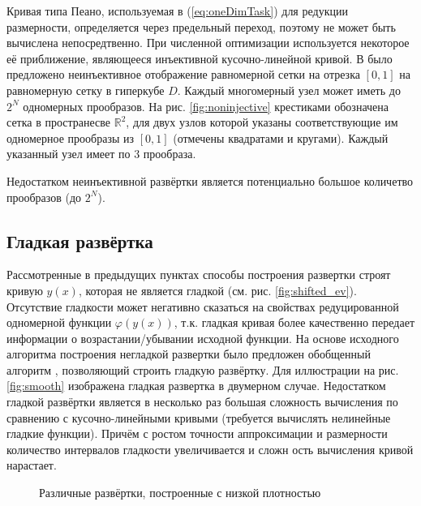 Кривая типа Пеано, используемая в (\ref{eq:oneDimTask}) для редукции размерности, определяется через предельный переход,
поэтому не может быть вычислена непосредтвенно. При численной оптимизации используется некоторое её приближение, являющееся
инъективной кусочно-линейной кривой. В \cite{strongin1978} было предложено неинъективное отображение равномерной сетки на
отрезка $[0,1]$ на равномерную сетку в гиперкубе $D$. Каждый многомерный узел может иметь до $2^N$ одномерных прообразов.
На рис. \ref{fig:noninjective} крестиками обозначена сетка в пространесве $\mathbb{R}^2$, для двух узлов которой
указаны соответствующие им одномерное прообразы из $[0,1]$ (отмечены квадратами и кругами). Каждый указанный узел имеет по 3 прообраза.

Недостатком неинъективной развёртки является потенциально большое количетво прообразов (до $2^N$).


\subsection{Гладкая развёртка}

Рассмотренные в предыдущих пунктах способы построения развертки строят кривую $y(x)$, которая не является
гладкой (см. рис. \ref{fig:shifted_ev}). Отсутствие гладкости может негативно сказаться на свойствах редуцированной
одномерной функции $\varphi(y(x))$, т.к. гладкая кривая более качественно передает информации о возрастании/убывании
исходной функции. На основе исходного алгоритма построения негладкой развертки было предложен обобщенный алгоритм
\cite{Goryachih2017}, позволяющий строить гладкую развёртку. Для иллюстрации на рис. \ref{fig:smooth} изображена гладкая
развертка в двумерном случае. Недостатком гладкой развёртки является в несколько раз большая сложность вычисления по
сравнению с кусочно-линейными кривыми (требуется вычислять нелинейные гладкие функции). Причём с ростом точности аппроксимации и
размерности количество интервалов гладкости увеличивается и сложн ость вычисления кривой нарастает.

\begin{figure}[ht]
    \centering
    \caption{Различные развёртки, построенные с низкой плотностью}
\end{figure}

